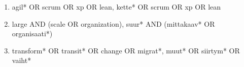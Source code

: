 \begin{enumerate}
    \item{agil* OR scrum OR xp OR lean, kette* OR scrum OR xp OR lean}
    \item{large AND (scale OR organization), suur* AND (mittakaav* OR organisaati*)}
    \item{transform* OR transit* OR change OR migrat*, muut* OR siirtym* OR vaiht*}
\end{enumerate}
